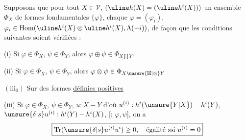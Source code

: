 Supposons que pour tout $X\in\mathcal V$, 
$(\uline h(X)=(\uline h^i(X)))$
un ensemble $\Phi_X$ de formes fondamentales
$\{\varphi\}$, chaque $\varphi=(\varphi_i)$,
$\varphi_i\in\operatorname{Hom}(\uline h^i(X)\otimes\uline h^i(X),
\Lambda(-i))$, de façon que les conditions suivantes
soient vérifiées :

(i) Si $\varphi\in\Phi_X$, $\psi\in\Phi_Y$, alors
$\varphi\oplus\psi\in\Phi_{X\amalg Y}$.

(ii) Si $\varphi\in\Phi_X$, $\psi\in\Phi_Y$,
alors $\varphi\otimes\psi\in\Phi_{X\unsure{\boxtimes|\otimes}Y}$

$(\mathrm{iii}_0)$ Sur
des formes \uline{définies positives}
\margin{[il suffit $X=e$ \deleted{\unsure{lorsque}}]}

 

(iii) Si $\varphi\in\Phi_X$, $\psi\in\Phi_Y$,
$u:X\mathbin{-}Y$ d'où
$u^{(i)}:h^i(\unsure{Y|X})\mathbin{-}h^i(Y)$,
 $\unsure{\delta|s}u^{(i)}:h^i(Y)\mathbin{-}h^i(X)$,
[: $\varphi,\psi$], on a
\[
\boxed{\operatorname{Tr}(\unsure{\delta|s}u^{(i)}u^i)\geq0,
\quad\text{égalité ssi }u^{(i)}=0}
\]
